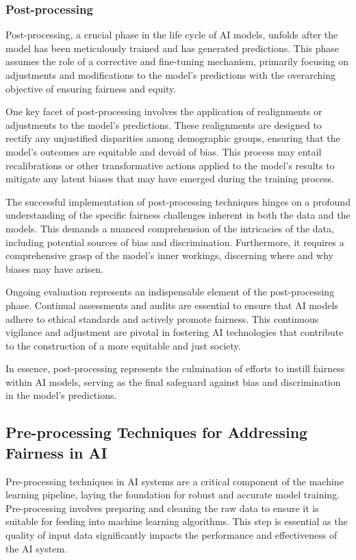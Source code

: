 \documentclass[12pt,a4paper,openright,twoside]{book}
\begin{document}
\subsubsection{Post-processing}
Post-processing, a crucial phase in the life cycle of AI models, unfolds after the model has been meticulously trained and has generated predictions. This phase assumes the role of a corrective and fine-tuning mechanism, primarily focusing on adjustments and modifications to the model's predictions with the overarching objective of ensuring fairness and equity. 

One key facet of post-processing involves the application of realignments or adjustments to the model's predictions. These realignments are designed to rectify any unjustified disparities among demographic groups, ensuring that the model's outcomes are equitable and devoid of bias. This process may entail recalibrations or other transformative actions applied to the model's results to mitigate any latent biases that may have emerged during the training process. 

The successful implementation of post-processing techniques hinges on a profound understanding of the specific fairness challenges inherent in both the data and the models. This demands a nuanced comprehension of the intricacies of the data, including potential sources of bias and discrimination. Furthermore, it requires a comprehensive grasp of the model's inner workings, discerning where and why biases may have arisen. 

Ongoing evaluation represents an indispensable element of the post-processing phase. Continual assessments and audits are essential to ensure that AI models adhere to ethical standards and actively promote fairness. This continuous vigilance and adjustment are pivotal in fostering AI technologies that contribute to the construction of a more equitable and just society. 

In essence, post-processing represents the culmination of efforts to instill fairness within AI models, serving as the final safeguard against bias and discrimination in the model's predictions.

\subsection{Pre-processing Techniques for Addressing Fairness in AI}

Pre-processing techniques in AI systems are a critical component of the machine learning pipeline, laying the foundation for robust and accurate model training. Pre-processing involves preparing and cleaning the raw data to ensure it is suitable for feeding into machine learning algorithms. This step is essential as the quality of input data significantly impacts the performance and effectiveness of the AI system. 
\end{document}
